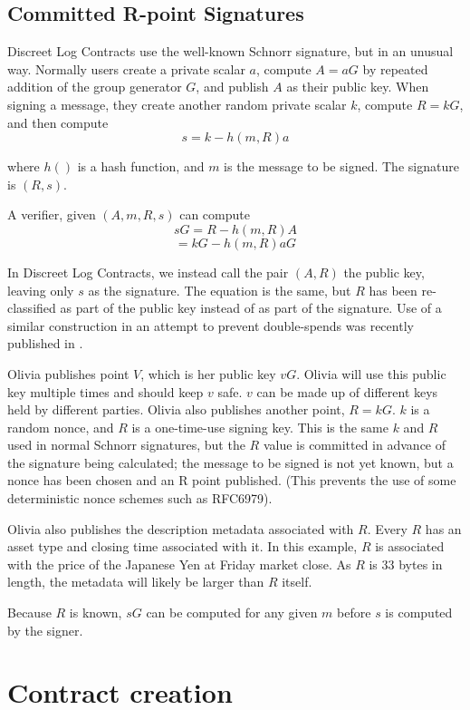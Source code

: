 \documentclass[11pt]{article}
\begin{document}
\subsection*{Committed R-point Signatures}

Discreet Log Contracts use the well-known Schnorr signature\cite{schnorr1990efficient}, but in an unusual way.  Normally users create a private scalar \(a\), compute \(A = aG\) by repeated addition of the group generator \(G\), and publish \(A\) as their public key.  When signing a message, they create another random private scalar \(k\), compute \(R = kG\), and then compute  \[s = k - h(m, R)a\]

where \(h()\) is a hash function, and \(m\) is the message to be signed.  The signature is \((R, s)\).

A verifier, given \((A, m, R, s)\) can compute
\[sG = R - h(m, R)A\]
\[= kG - h(m, R)aG\]

In Discreet Log Contracts, we instead call the pair \((A, R)\) the public key, leaving only \(s\) as the signature.  The equation is the same, but \(R\) has been re-classified as part of the public key instead of as part of the signature.  Use of a similar construction in an attempt to prevent double-spends was recently published in \cite{cryptoeprint:2017:394}.

Olivia publishes point \(V\), which is her public key \(vG\).  Olivia will use this public key multiple times and should keep \(v\) safe.  \(v\) can be made up of different keys held by different parties.  Olivia also publishes another point, \(R = kG\).  \(k\) is a random nonce, and \(R\) is a one-time-use signing key.  This is the same \(k\) and \(R\)  used in normal Schnorr signatures, but the \(R\) value is committed in advance of the signature being calculated; the message to be signed is not yet known, but a nonce has been chosen and an R point published.  (This prevents the use of some deterministic nonce schemes such as RFC6979).

Olivia also publishes the description metadata associated with \(R\).  Every \(R\) has an asset type and closing time associated with it.  In this example, \(R\) is associated with the price of the Japanese Yen at Friday market close.  As \(R\) is 33 bytes in length, the metadata will likely be larger than \(R\) itself.

Because \(R\) is known, \(sG\) can be computed for any given \(m\) before \(s\) is computed by the signer.

\section*{Contract creation}
\end{document}
